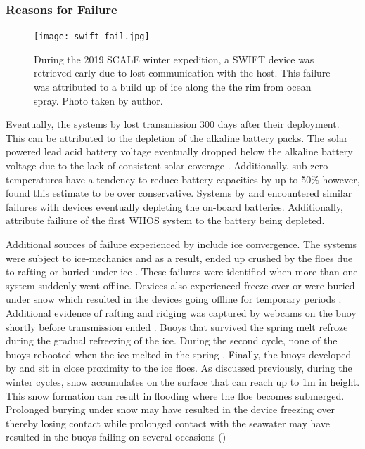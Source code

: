 \subsubsection{Reasons for Failure}
\label{ch2:sec3_failiure}
\begin{figure}[H]
	\centering
	\texttt{[image: swift\_fail.jpg]}
	\caption{During the 2019 SCALE winter expedition, a SWIFT device was retrieved early due to lost communication with the host. This failure was attributed to a build up of ice along the the rim from ocean spray. Photo taken by author.}
	\label{fig:swift_fail}
\end{figure}
Eventually, the systems by \textcite{doble2017robust} lost transmission 300 days after their deployment. This can be attributed to the depletion of the alkaline battery packs. The solar powered lead acid battery voltage eventually dropped below the alkaline battery voltage due to the lack of consistent solar coverage \cite{doble2017robust}. Additionally, sub zero temperatures have a tendency to reduce battery capacities by up to 50\% \cite{doble2017robust} however, \textcite{doble2017robust} found this estimate to be over conservative. Systems by \textcite{kohout2015device} and \textcite{doble2017robust} encountered similar failures with devices eventually depleting the on-board batteries. Additionally, \cite{alberello2019drift} attribute failiure of the first WIIOS system to the battery being depleted.\par 

Additional sources of failure experienced by \textcite{doble2017robust} include ice convergence. The systems were subject to ice-mechanics and as a result, ended up crushed by the floes due to rafting or buried under ice \textcite{doble2017robust}. These failures were identified when more than one system suddenly went offline. Devices also experienced freeze-over or were buried under snow which resulted in the devices going offline for temporary periods \cite{doble2017robust}. Additional evidence of rafting and ridging was captured by webcams on the buoy shortly before transmission ended \cite{doble2017robust}. Buoys that survived the spring melt refroze during the gradual refreezing of the ice. During the second cycle, none of the buoys rebooted when the ice melted in the spring \cite{doble2017robust}. Finally, the buoys developed by \textcite{kohout2015device} and \textcite{rabault2017measurements} sit in close proximity to the ice floes. As discussed previously, during the winter cycles, snow accumulates on the surface that can reach up to 1m in height. This snow formation can result in flooding where the floe becomes submerged. Prolonged burying under snow may have resulted in the device freezing over thereby losing contact while prolonged contact with the seawater may have resulted in the buoys failing on several occasions (\cite{kohout2015device,vichi2019effects,albarello2020drift,rabault2019open})\par 

